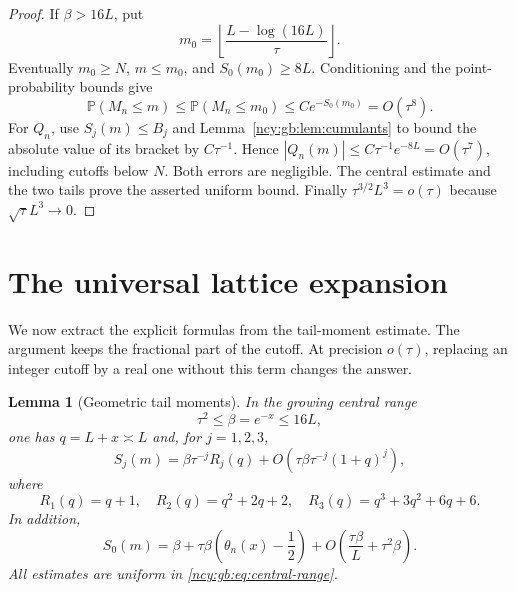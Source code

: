 \documentclass[11pt,letterpaper]{article}
\numberwithin{equation}{section}
\newtheorem{lemma}[theorem]{Lemma}
\theoremstyle{remark}\newtheorem{remark}[theorem]{Remark}
\theoremstyle{definition}\newtheorem{definition}[theorem]{Definition}\theoremstyle{plain}
\newcommand{\Pbb}{\mathbb P}
\begin{document}
\begin{proof}
If $\beta>16L$, put
\[
 m_0=\left\lfloor\frac{L-\log(16L)}{\tau}\right\rfloor.
\]
Eventually $m_0\geq N$, $m\leq m_0$, and
$S_0(m_0)\geq8L$.  Conditioning and the point-probability bounds give
\[
 \Pbb(M_n\leq m)\leq\Pbb(M_n\leq m_0)
 \leq C e^{-S_0(m_0)}=O(\tau^8).
\]
For $Q_n$, use $S_j(m)\leq B_j$ and Lemma~\ref{ncy:gb:lem:cumulants} to bound
the absolute value of its bracket by $C\tau^{-1}$.  Hence
$|Q_n(m)|\leq C\tau^{-1}e^{-8L}=O(\tau^7)$, including cutoffs below
$N$.  Both errors are negligible.  The central estimate and the two tails
prove the asserted uniform bound.  Finally
$\tau^{3/2}L^3=o(\tau)$ because $\sqrt\tau L^3\to0$.
\end{proof}

\section{The universal lattice expansion}\label{ncy:gb:sec:lattice}

We now extract the explicit formulas from the tail-moment estimate.
The argument keeps the fractional part of the cutoff. At precision
\(o(\tau)\), replacing an integer cutoff by a real one without this
term changes the answer.

\begin{lemma}[Geometric tail moments]\label{ncy:gb:lem:tails}
In the growing central range
\begin{equation}\label{ncy:gb:eq:central-range}
 \tau^2\le\beta=e^{-x}\le16L,
\end{equation}
one has \(q=L+x\asymp L\) and, for \(j=1,2,3\),
\begin{equation}\label{ncy:gb:eq:tail-polys}
 S_j(m)=\beta\tau^{-j}R_j(q)
 +O\left(\tau\beta\tau^{-j}(1+q)^j\right),
\end{equation}
where
\[
 R_1(q)=q+1,\quad R_2(q)=q^2+2q+2,\quad
 R_3(q)=q^3+3q^2+6q+6.
\]
In addition,
\begin{equation}\label{ncy:gb:eq:S0-lattice}
 S_0(m)=\beta+
 \tau\beta\left(\theta_n(x)-\frac12\right)
 +O\left(\frac{\tau\beta}{L}+\tau^2\beta\right).
\end{equation}
All estimates are uniform in \eqref{ncy:gb:eq:central-range}.
\end{lemma}
\end{document}
